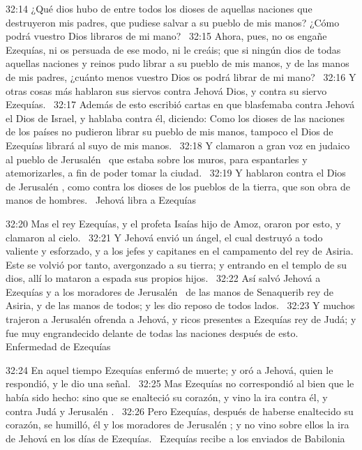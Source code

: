 																																32:14 ¿Qué dios hubo de entre todos los dioses de aquellas naciones que destruyeron mis padres, que pudiese salvar a su pueblo de mis manos? ¿Cómo podrá vuestro Dios libraros de mi mano?  
																																32:15 Ahora, pues, no os engañe Ezequías, ni os persuada de ese modo, ni le creáis; que si ningún dios de todas aquellas naciones y reinos pudo librar a su pueblo de mis manos, y de las manos de mis padres, ¿cuánto menos vuestro Dios os podrá librar de mi mano?  
																																32:16 Y otras cosas más hablaron sus siervos contra Jehová Dios, y contra su siervo Ezequías.  
																																32:17 Además de esto escribió cartas en que blasfemaba contra Jehová el Dios de Israel, y hablaba contra él, diciendo: Como los dioses de las naciones de los países no pudieron librar su pueblo de mis manos, tampoco el Dios de Ezequías librará al suyo de mis manos.  
																																32:18 Y clamaron a gran voz en judaico al pueblo de Jerusalén  que estaba sobre los muros, para espantarles y atemorizarles, a fin de poder tomar la ciudad.  
																																32:19 Y hablaron contra el Dios de Jerusalén , como contra los dioses de los pueblos de la tierra, que son obra de manos de hombres.  
																																Jehová libra a Ezequías 
																																
																																32:20 Mas el rey Ezequías, y el profeta Isaías hijo de Amoz, oraron por esto, y clamaron al cielo.  
																																32:21 Y Jehová envió un ángel, el cual destruyó a todo valiente y esforzado, y a los jefes y capitanes en el campamento del rey de Asiria. Este se volvió por tanto, avergonzado a su tierra; y entrando en el templo de su dios, allí lo mataron a espada sus propios hijos.  
																																32:22 Así salvó Jehová a Ezequías y a los moradores de Jerusalén  de las manos de Senaquerib rey de Asiria, y de las manos de todos; y les dio reposo de todos lados.  
																																32:23 Y muchos trajeron a Jerusalén ofrenda a Jehová, y ricos presentes a Ezequías rey de Judá; y fue muy engrandecido delante de todas las naciones después de esto.  
																																Enfermedad de Ezequías 
																																
																																32:24 En aquel tiempo Ezequías enfermó de muerte; y oró a Jehová, quien le respondió, y le dio una señal.  
																																32:25 Mas Ezequías no correspondió al bien que le había sido hecho: sino que se enalteció su corazón, y vino la ira contra él, y contra Judá y Jerusalén .  
																																32:26 Pero Ezequías, después de haberse enaltecido su corazón, se humilló, él y los moradores de Jerusalén ; y no vino sobre ellos la ira de Jehová en los días de Ezequías.  
																																Ezequías recibe a los enviados de Babilonia 
																																

